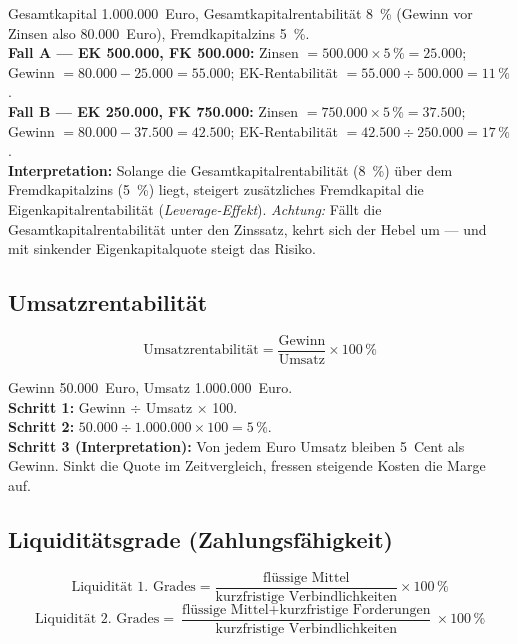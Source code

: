 \documentclass[11pt, a4paper]{article}
\begin{document}
\begin{beispiel}[title={Beispiel: Leverage-Effekt (Hebelwirkung des Fremdkapitals)}]
Gesamtkapital 1.000.000~Euro, Gesamtkapitalrentabilität 8~\% (Gewinn vor Zinsen also
80.000~Euro), Fremdkapitalzins 5~\%.\\
\textbf{Fall A --- EK 500.000, FK 500.000:} Zinsen $= 500.000 \times 5\,\% = 25.000$;
Gewinn $= 80.000 - 25.000 = 55.000$; EK-Rentabilität $= 55.000 \div 500.000
= 11\,\%$.\\
\textbf{Fall B --- EK 250.000, FK 750.000:} Zinsen $= 750.000 \times 5\,\% = 37.500$;
Gewinn $= 80.000 - 37.500 = 42.500$; EK-Rentabilität $= 42.500 \div 250.000
= 17\,\%$.\\
\textbf{Interpretation:} Solange die Gesamtkapitalrentabilität (8~\%) über dem
Fremdkapitalzins (5~\%) liegt, steigert zusätzliches Fremdkapital die
Eigenkapitalrentabilität (\emph{Leverage-Effekt}). \emph{Achtung:} Fällt die
Gesamtkapitalrentabilität unter den Zinssatz, kehrt sich der Hebel um --- und mit
sinkender Eigenkapitalquote steigt das Risiko.
\end{beispiel}

\subsection{Umsatzrentabilität}

\[
\mbox{Umsatzrentabilität} = \frac{\mbox{Gewinn}}{\mbox{Umsatz}} \times 100\,\%
\]

\begin{beispiel}[title={Beispiel: Umsatzrentabilität}]
Gewinn 50.000~Euro, Umsatz 1.000.000~Euro.\\
\textbf{Schritt 1:} Gewinn $\div$ Umsatz $\times$ 100.\\
\textbf{Schritt 2:} $50.000 \div 1.000.000 \times 100 = 5\,\%$.\\
\textbf{Schritt 3 (Interpretation):} Von jedem Euro Umsatz bleiben 5~Cent als Gewinn.
Sinkt die Quote im Zeitvergleich, fressen steigende Kosten die Marge auf.
\end{beispiel}

\subsection{Liquiditätsgrade (Zahlungsfähigkeit)}

\[
\mbox{Liquidität 1. Grades} =
\frac{\mbox{flüssige Mittel}}{\mbox{kurzfristige Verbindlichkeiten}} \times 100\,\%
\]
\[
\mbox{Liquidität 2. Grades} =
\frac{\mbox{flüssige Mittel} + \mbox{kurzfristige Forderungen}}
     {\mbox{kurzfristige Verbindlichkeiten}} \times 100\,\%
\]
\end{document}
